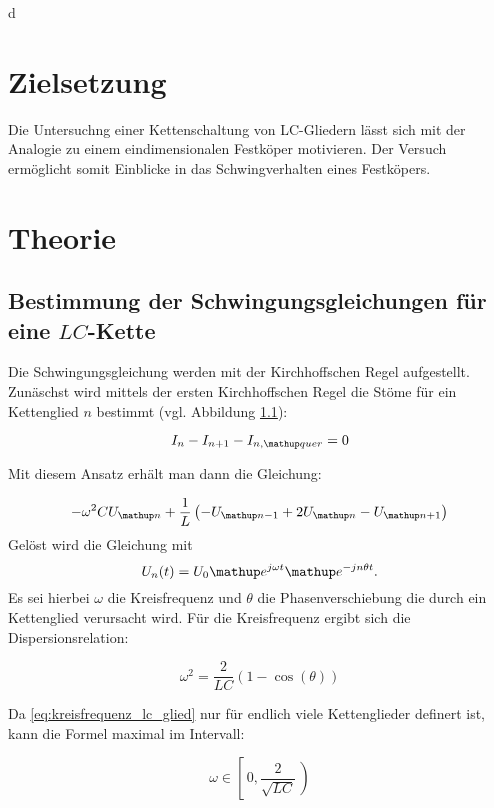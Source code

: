 d\setcounter{page}{1}
\section*{Zielsetzung}
Die Untersuchng einer Kettenschaltung von LC-Gliedern lässt sich mit der Analogie  
zu einem eindimensionalen Festköper motivieren.
Der Versuch ermöglicht somit Einblicke in das Schwingverhalten eines 
Festköpers.

\section{Theorie}

\subsection{Bestimmung der Schwingungsgleichungen für eine $LC$-Kette}
Die Schwingungsgleichung werden mit der Kirchhoffschen Regel aufgestellt.
Zunäschst wird mittels der ersten Kirchhoffschen Regel die Stöme für ein Kettenglied $n$ 
bestimmt (vgl. Abbildung \ref{}):

\begin{equation}
\label{eq:kircheins_lc}
I_n-I_{n+1}-I_{n,\map{quer}}=0
\end{equation}

Mit diesem Ansatz erhält man dann die Gleichung:

\begin{equation}
\label{eq:gleichung_lc}
-\omega^2CU\ua{n}+\frac{1}{L}\left(-U\ua{n-1}+2U\ua{n}-U\ua{n+1}\right)
\end{equation}
Gelöst wird die Gleichung mit
\begin{equation}
\label{eq:loesung_gleichung_lc}
U_n(t)=U_0 \map{e}^{j\omega t} \map{e}^{-jn\theta t}.
\end{equation}
Es sei hierbei $\omega$ die Kreisfrequenz und $\theta$ die Phasenverschiebung 
die durch ein Kettenglied verursacht wird.
Für die Kreisfrequenz ergibt sich die Dispersionsrelation:

\begin{equation}
\label{eq:kreisfrequenz_lc_glied}
\omega^2=\frac{2}{LC}\left(1-\cos(\theta)\right)
\end{equation}

Da \eqref{eq:kreisfrequenz_lc_glied} nur für endlich viele Kettenglieder definert ist, kann
die Formel maximal im Intervall:

\begin{equation}
\label{eq:menge_omega_lc_glied}
\omega\in\left[\,0,\frac{2}{\sqrt{LC}}\,\right)
\end{equation}

